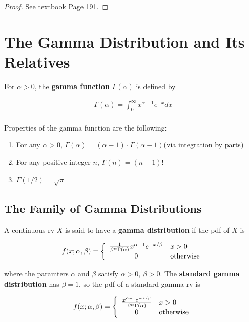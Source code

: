 \begin{proof}
    See textbook Page 191.
\end{proof}

\section{The Gamma Distribution and Its Relatives}

\begin{definition}
    For $\alpha > 0$, the \textbf{gamma function} $\Gamma(\alpha)$ is defined by

    \begin{align*}
        \Gamma(\alpha) = \int_0^\infty x^{\alpha-1}e^{-x}dx \\
    \end{align*}

    Properties of the gamma function are the following:

    \begin{enumerate}
        \item For any $\alpha>0$, $\Gamma(\alpha) = (\alpha - 1)\cdot \Gamma(\alpha - 1)$(via integration by parts)
        \item For any positive integer $n$, $\Gamma(n) = (n-1)!$
        \item $\Gamma(1/2) = \sqrt{\pi}$
    \end{enumerate}
\end{definition}

\subsection{The Family of Gamma Distributions}

\begin{definition}
    A continuous rv $X$ is said to have a \textbf{gamma distribution} if the pdf of $X$ is 

    \begin{align*}
        f(x;\alpha,\beta) = \left\{\begin{array}{cl}
            \frac{1}{\beta^\alpha\Gamma(\alpha)}x^{\alpha-1}e^{-x/\beta} & x>0 \\
            0 & {\rm otherwise} \\
        \end{array}\right.
    \end{align*}

    where the paramters $\alpha$ and $\beta$ satisfy $\alpha>0$, $\beta>0$. The \textbf{standard gamma distribution} has $\beta=1$, so the pdf of a standard gamma rv is 

    \begin{align*}
        f(x;\alpha,\beta) = \left\{\begin{array}{cl}
            \frac{x^{\alpha-1}e^{-x/\beta}}{\beta^\alpha\Gamma(\alpha)} & x>0 \\
            0 & {\rm otherwise} \\
        \end{array}\right.
    \end{align*}
\end{definition}

